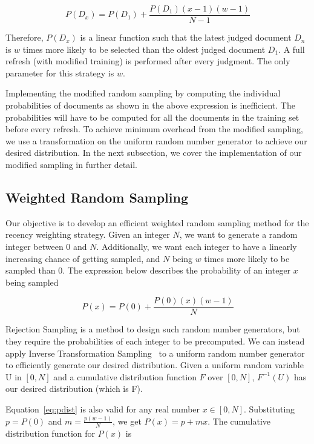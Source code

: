 \begin{equation*}
P(D_x) = P(D_1) + \frac{P(D_1)(x-1)(w-1)}{N-1}
\end{equation*}

Therefore, $P(D_x)$ is a linear function such that the latest judged document
$D_n$ is $w$ times more likely to be selected than the oldest judged document
$D_1$. A full refresh (with modified training) is performed after every
judgment. The only parameter for this strategy is $w$.

Implementing the modified random sampling by computing the individual
probabilities of documents as shown in the above expression is inefficient. The
probabilities will have to be computed for all the documents in the training set
before every refresh. To achieve minimum overhead from the modified sampling, we
use a transformation on the uniform random number generator to achieve our
desired distribution. In the next subsection, we cover the implementation of our
modified sampling in further detail.

\subsection{Weighted Random Sampling}
\label{AppendixA}
Our objective is to develop an efficient weighted random sampling method for the
recency weighting strategy. Given an integer $N$,
we want to generate a random integer between $0$ and $N$. Additionally, we want
each integer to have a linearly increasing chance of getting sampled, and $N$
being $w$ times more likely to be sampled than $0$. The expression below
describes the probability of an integer $x$ being sampled

\begin{equation}
\label{eq:pdist}
P(x) = P(0) + \frac{P(0)(x)(w-1)}{N}
\end{equation}

Rejection Sampling is a method to design such random number generators, but they
require the probabilities of each integer to be precomputed. We can instead
apply Inverse Transformation Sampling~\cite{devroye} to a uniform random number generator to
efficiently generate our desired distribution. Given a uniform random variable U
in $[0,N]$ and a cumulative distribution function $F$ over $[0, N]$, $F^{-1}(U)$
has our desired distribution (which is F).


Equation~\ref{eq:pdist} is also valid for any real number $x \in [0,N]$.
Substituting $p = P(0)$ and $m = \frac{p(w-1)}{N}$, we get $P(x) = p + mx$. The
cumulative distribution function for $P(x)$ is

